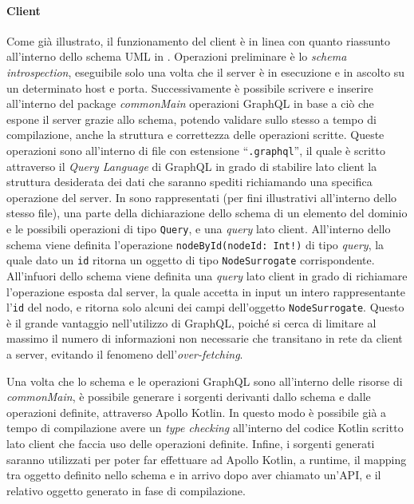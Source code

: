 \paragraph{Client}
Come già illustrato, il funzionamento del client è in linea con quanto riassunto all'interno dello schema UML in . Operazioni preliminare è lo \textit{schema introspection},
eseguibile solo una volta che il server è in esecuzione e in ascolto su un determinato host e porta. Successivamente è possibile scrivere e inserire all'interno del package \textit{commonMain}
operazioni GraphQL in base a ciò che espone il server grazie allo schema, potendo validare sullo stesso a tempo di compilazione, anche la struttura e correttezza delle operazioni scritte.
Queste operazioni sono all'interno di file con estensione ``\texttt{.graphql}'', il quale è scritto attraverso il \textit{Query Language} di GraphQL in grado di stabilire lato client
la struttura desiderata dei dati che saranno spediti richiamando una specifica operazione del server. In  sono rappresentati (per fini illustrativi all'interno dello stesso
file), una parte della dichiarazione dello schema di un elemento del dominio e le possibili operazioni di tipo \texttt{Query}, e una \textit{query} lato client.
All'interno dello schema viene definita l'operazione \texttt{nodeById(nodeId: Int!)} di tipo \textit{query}, la quale dato un \texttt{id} ritorna un oggetto di tipo \texttt{NodeSurrogate}
corrispondente. All'infuori dello schema viene definita una \textit{query} lato client in grado di richiamare l'operazione esposta dal server, la quale accetta in input un intero rappresentante
l'\texttt{id} del nodo, e ritorna solo alcuni dei campi dell'oggetto \texttt{NodeSurrogate}. Questo è il grande vantaggio nell'utilizzo di GraphQL, poiché si cerca di limitare al massimo
il numero di informazioni non necessarie che transitano in rete da client a server, evitando il fenomeno dell'\textit{over-fetching}.

Una volta che lo schema e le operazioni GraphQL sono all'interno delle risorse di \textit{commonMain}, è possibile generare i sorgenti derivanti dallo schema e dalle operazioni definite,
attraverso Apollo Kotlin. In questo modo è possibile già a tempo di compilazione avere un \textit{type checking} all'interno del codice Kotlin scritto lato client che faccia uso delle operazioni
definite. Infine, i sorgenti generati saranno utilizzati per poter far effettuare ad Apollo Kotlin, a runtime, il mapping tra oggetto definito nello schema e in arrivo dopo aver chiamato un'\ac{API},
e il relativo oggetto generato in fase di compilazione.

